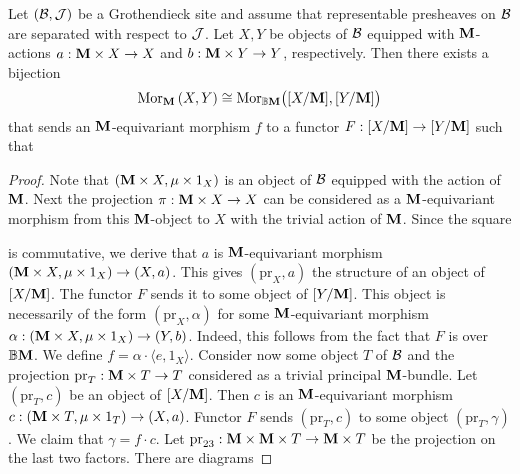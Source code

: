 \begin{theorem}\label{theorem:equivariant_morphisms_can_described_by_fibered_categories}
Let $({\mathcal B},{\mathcal J})$ be a Grothendieck site and assume that representable presheaves on ${\mathcal B}$ are separated with respect to ${\mathcal J}$. Let $X,Y$ be objects of ${\mathcal B}$ equipped with $\mathbf{M}$-actions $a:\mathbf{M}\times X\rightarrow X$ and $b:\mathbf{M}\times Y\rightarrow Y$, respectively. Then there exists a bijection
$$\mathrm{Mor}_{\mathbf{M}}\left(X,Y\right)\cong \mathrm{Mor}_{\mathbb{B}\mathbf{M}}\big([X/\mathbf{M}],[Y/\mathbf{M}]\big)$$
that sends an $\mathbf{M}$-equivariant morphism $f$ to a functor $F:[X/\mathbf{M}]\rightarrow [Y/\mathbf{M}]$ such that
\end{theorem}
\begin{proof}
Note that $(\mathbf{M}\times X,\mu\times 1_X)$ is an object of ${\mathcal B}$ equipped with the action of $\mathbf{M}$. Next the projection $\pi:\mathbf{M}\times X\rightarrow X$ can be considered as a $\mathbf{M}$-equivariant morphism from this $\mathbf{M}$-object to $X$ with the trivial action of $\mathbf{M}$. Since the square
\begin{center}
\end{center}
is commutative, we derive that $a$ is $\mathbf{M}$-equivariant morphism $\left(\mathbf{M}\times X,\mu\times 1_X\right)\rightarrow \left(X,a\right)$. This gives $(\mathrm{pr}_X,a)$ the structure of an object of $[X/\mathbf{M}]$. The functor $F$ sends it to some object of $[Y/\mathbf{M}]$. This object is necessarily of the form $(\mathrm{pr}_X,\alpha)$ for some $\mathbf{M}$-equivariant morphism $\alpha:\left(\mathbf{M}\times X,\mu\times 1_X\right) \rightarrow \left(Y,b\right)$. Indeed, this follows from the fact that $F$ is over $\mathbb{B}\mathbf{M}$. We define $f = \alpha \cdot \langle e, 1_X\rangle$. Consider now some object $T$ of ${\mathcal B}$ and the projection $\mathrm{pr}_T:\mathbf{M}\times T\rightarrow T$ considered as a trivial principal $\mathbf{M}$-bundle. Let $(\mathrm{pr}_T,c)$ be an object of $[X/\mathbf{M}]$. Then $c$ is an $\mathbf{M}$-equivariant morphism $c:\left(\mathbf{M}\times T,\mu\times 1_T\right) \rightarrow (X,a)$. Functor $F$ sends $(\mathrm{pr}_T,c)$ to some object $(\mathrm{pr}_T,\gamma)$. We claim that $\gamma = f \cdot c$. Let $\mathrm{pr}_{23}:\mathbf{M}\times \mathbf{M}\times T\rightarrow \mathbf{M}\times T$ be the projection on the last two factors. There are diagrams

\end{proof}
